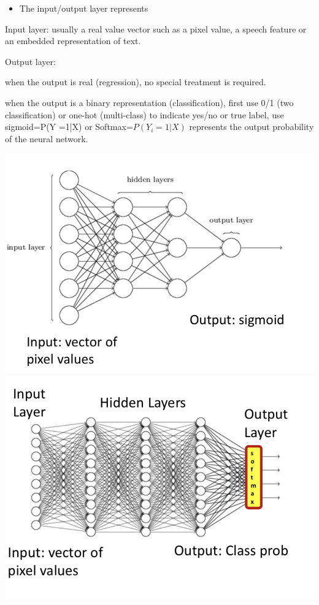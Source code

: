 \documentclass{article}
\begin{document}
	\begin{itemize}
		\item The input/output layer represents
	\end{itemize}
	
	
	Input layer: usually a real value vector such as a pixel value, a speech feature or an embedded representation of text.
	
	Output layer:
	
	when the output is real (regression), no special treatment is required.
	
	when the output is a binary representation (classification), first use 0/1 (two classification) or one-hot (multi-class) to indicate yes/no or true label, use sigmoid=P(Y =1|X) or Softmax=$P( Y_i =1|X)$ represents the output probability of the neural network.
	
	\includegraphics[scale=0.2]{62.png}
	\includegraphics[scale=0.2]{63.png}
	
\end{document}
